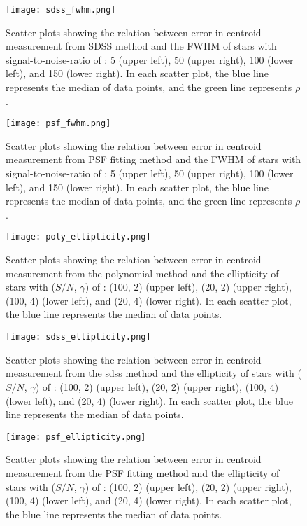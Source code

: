 \documentclass[12pt, preprint]{aastex}
\begin{document}
\begin{figure}[!htb]
  \texttt{[image: sdss\_fwhm.png]}
\endminipage
\caption{Scatter plots showing the relation between error in centroid measurement from SDSS method and the FWHM of stars with signal-to-noise-ratio of : 5 (upper left), 50 (upper right), 100 (lower left), and 150 (lower right). In each scatter plot, the blue line represents the median of data points, and the green line represents $\rho$.}\label{5}
\end{figure}

\begin{figure}[!htb]
  \texttt{[image: psf\_fwhm.png]}
\endminipage
\caption{Scatter plots showing the relation between error in centroid measurement from PSF fitting method and the FWHM of stars with signal-to-noise-ratio of : 5 (upper left), 50 (upper right), 100 (lower left), and 150 (lower right). In each scatter plot, the blue line represents the median of data points, and the green line represents $\rho$.}\label{6}
\end{figure}


\begin{figure}[!htb]
  \texttt{[image: poly\_ellipticity.png]}
\endminipage
\caption{Scatter plots showing the relation between error in centroid measurement from the polynomial method and the ellipticity of stars with ($S/N$, $\gamma$) of : (100, 2) (upper left), (20, 2) (upper right), (100, 4) (lower left), and (20, 4) (lower right). In each scatter plot, the blue line represents the median of data points.}\label{7}
\end{figure}

\begin{figure}[!htb]
  \texttt{[image: sdss\_ellipticity.png]}
\endminipage
\caption{Scatter plots showing the relation between error in centroid measurement from the sdss method and the ellipticity of stars with ($S/N$, $\gamma$) of : (100, 2) (upper left), (20, 2) (upper right), (100, 4) (lower left), and (20, 4) (lower right). In each scatter plot, the blue line represents the median of data points.}\label{8}
\end{figure}

\begin{figure}[!htb]
  \texttt{[image: psf\_ellipticity.png]}
\endminipage
\caption{Scatter plots showing the relation between error in centroid measurement from the PSF fitting method and the ellipticity of stars with ($S/N$, $\gamma$) of : (100, 2) (upper left), (20, 2) (upper right), (100, 4) (lower left), and (20, 4) (lower right). In each scatter plot, the blue line represents the median of data points.}\label{9}
\end{figure}
\end{document}
